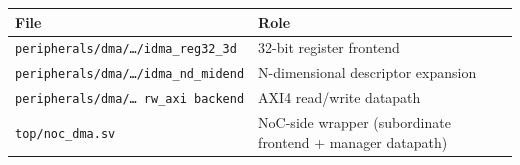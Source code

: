 \begin{tabular}{@{}ll@{}}
\toprule
\textbf{File} & \textbf{Role} \\
\midrule
\texttt{peripherals/dma/\ldots/idma\_reg32\_3d} & 32-bit register frontend \\
\texttt{peripherals/dma/\ldots/idma\_nd\_midend} & N-dimensional descriptor expansion \\
\texttt{peripherals/dma/\ldots\ rw\_axi backend} & AXI4 read/write datapath \\
\texttt{top/noc\_dma.sv} & NoC-side wrapper (subordinate frontend + manager datapath) \\
\bottomrule
\end{tabular}

\newpage
